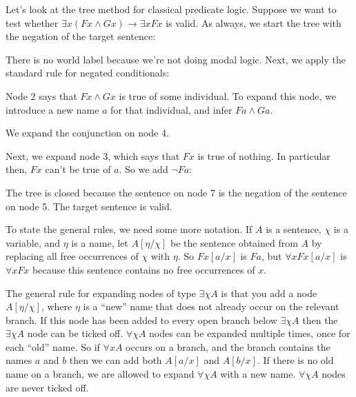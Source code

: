 Let's look at the tree method for classical predicate logic. Suppose we want to
test whether $\exists x(Fx \land Gx) \to \exists x Fx$ is valid. As always, we
start the tree with the negation of the target sentence:

\medskip
\begin{center}
\end{center}
\medskip%
There is no world label because we're not doing modal logic. Next, we apply the
standard rule for negated conditionals:%
\medskip
\begin{center}
\end{center}

\medskip\noindent
Node 2 says that $Fx \land Gx$ is true of some individual. To
expand this node, we introduce a new name $a$ for that individual, and infer
$Fa \land Ga$.
\medskip
\begin{center}
\end{center}

\medskip\noindent%
We expand the conjunction on node 4.
\medskip
\begin{center}
\end{center}
Next, we expand node 3, which says that $Fx$ is true of nothing. In particular
then, $Fx$ can't be true of $a$. So we add $\neg Fa$:

\medskip
\begin{center} 
\end{center}

\medskip\noindent%
The tree is closed because the sentence on node 7 is the negation of the
sentence on node 5. The target sentence is valid.

To state the general rules, we need some more notation. If $A$ is a sentence,
$\chi$ is a variable, and $\eta$ is a name, let $A[\eta/\chi]$ be the sentence
obtained from $A$ by replacing all free occurrences of $\chi$ with $\eta$. So
$Fx[a/x]$ is $Fa$, but $\forall x Fx[a/x]$ is $\forall x Fx$ because this
sentence contains no free occurrences of $x$.

The general rule for expanding nodes of type $\exists \chi A$ is that you add a
node $A[\eta/\chi]$, where $\eta$ is a ``new'' name that does not already occur
on the relevant branch. If this node has been added to every open branch below
$\exists \chi A$ then the $\exists \chi A$ node can be ticked off.
$\forall \chi A$ nodes can be expanded multiple times, once for each ``old''
name. So if $\forall x A$ occurs on a branch, and the branch contains the names
$a$ and $b$ then we can add both $A[a/x]$ and $A[b/x]$. If there is no old name
on a branch, we are allowed to expand $\forall \chi A$ with a new name.
$\forall \chi A$ nodes are never ticked off.

